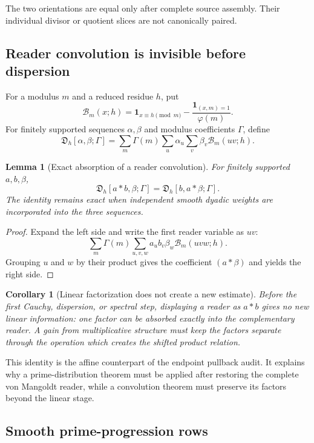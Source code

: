\documentclass[11pt]{article}
\newtheorem{lemma}[theorem]{Lemma}
\newtheorem{corollary}[theorem]{Corollary}
\theoremstyle{definition}
\theoremstyle{remark}
\newcommand{\one}{\mathbf 1}
\begin{document}
The two orientations are equal only after complete source assembly.  Their
individual divisor or quotient slices are not canonically paired.

\subsection{Reader convolution is invisible before dispersion}

For a modulus $m$ and a reduced residue $h$, put
\[
 \mathscr B_m(x;h)
 =\one_{x\equiv h\pmod m}
  -\frac{\one_{(x,m)=1}}{\varphi(m)}.
 \tag{M.6}
\]
For finitely supported sequences $\alpha,\beta$ and modulus coefficients
$\Gamma$, define
\[
 \mathfrak D_h[\alpha,\beta;\Gamma]
 =\sum_m\Gamma(m)
   \sum_u\alpha_u\sum_v\beta_v\mathscr B_m(uv;h).
 \tag{M.7}
\]

\begin{lemma}[Exact absorption of a reader convolution]
\label{lem:hard-convolution-absorption}
For finitely supported $a,b,\beta$,
\[
 \boxed{
 \mathfrak D_h[a*b,\beta;\Gamma]
 =\mathfrak D_h[b,a*\beta;\Gamma].}
 \tag{M.8}
\]
The identity remains exact when independent smooth dyadic weights are
incorporated into the three sequences.
\end{lemma}

\begin{proof}
Expand the left side and write the first reader variable as $u v$:
\[
 \sum_m\Gamma(m)\sum_{u,v,w}
 a_u b_v\beta_w\mathscr B_m(uvw;h).
\]
Grouping $u$ and $w$ by their product gives the coefficient
$(a*\beta)$ and yields the right side.
\end{proof}

\begin{corollary}[Linear factorization does not create a new estimate]
\label{cor:hard-linear-invisibility}
Before the first Cauchy, dispersion, or spectral step, displaying a reader as
$a*b$ gives no new linear information: one factor can be absorbed exactly
into the complementary reader.  A gain from multiplicative structure must
keep the factors separate through the operation which creates the shifted
product relation.
\end{corollary}

This identity is the affine counterpart of the endpoint pullback audit.  It
explains why a prime-distribution theorem must be applied after restoring the
complete von Mangoldt reader, while a convolution theorem must preserve its
factors beyond the linear stage.

\subsection{Smooth prime-progression rows}
\end{document}
